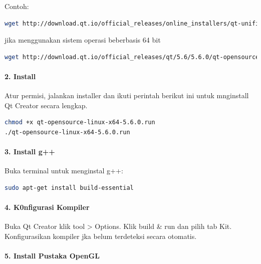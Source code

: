 Contoh:

\begin{lstlisting}[language=sh, numbers=none]
wget http://download.qt.io/official_releases/online_installers/qt-unified-linux-x86-online.run
\end{lstlisting}

jika menggunakan sistem operasi beberbasis 64 bit

\begin{lstlisting}[language=sh, numbers=none]
wget http://download.qt.io/official_releases/qt/5.6/5.6.0/qt-opensource-linux-x64-5.6.0.run
\end{lstlisting}

\paragraph{2. Install}\label{install}

Atur permisi, jalankan installer dan ikuti perintah berikut ini untuk
mnginstall Qt Creator secara lengkap.

\begin{lstlisting}[language=sh, numbers=none]
chmod +x qt-opensource-linux-x64-5.6.0.run
./qt-opensource-linux-x64-5.6.0.run
\end{lstlisting}

\paragraph{3. Install g++}\label{install-gpp}

Buka terminal untuk menginstal g++:

\begin{lstlisting}[language=sh, numbers=none]
sudo apt-get install build-essential
\end{lstlisting}

\paragraph{4. K0nfigurasi Kompiler}\label{k0nfigurasi-kompiler}

Buka Qt Creator klik tool \textgreater{} Options. Klik build \& run dan
pilih tab Kit. Konfigurasikan kompiler jka belum terdeteksi secara
otomatis.

\paragraph{5. Install Pustaka OpenGL}\label{install-pustaka-opengl}

